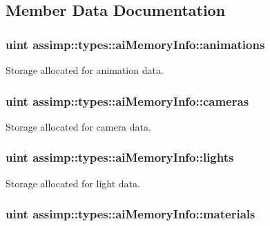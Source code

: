 \subsection{Member Data Documentation}
\hypertarget{structassimp_1_1types_1_1ai_memory_info_aee7913ca2406845fb1e38e4ae7c0c45a}{
\subsubsection[{animations}]{\setlength{\rightskip}{0pt plus 5cm}uint assimp\+::types\+::ai\+Memory\+Info\+::animations}}\label{structassimp_1_1types_1_1ai_memory_info_aee7913ca2406845fb1e38e4ae7c0c45a}
Storage allocated for animation data. \hypertarget{structassimp_1_1types_1_1ai_memory_info_a71247c6f2abba98245066bb3147c5e0f}{
\subsubsection[{cameras}]{\setlength{\rightskip}{0pt plus 5cm}uint assimp\+::types\+::ai\+Memory\+Info\+::cameras}}\label{structassimp_1_1types_1_1ai_memory_info_a71247c6f2abba98245066bb3147c5e0f}
Storage allocated for camera data. \hypertarget{structassimp_1_1types_1_1ai_memory_info_af3a707fc5e15341b8c9437a7e08ce587}{
\subsubsection[{lights}]{\setlength{\rightskip}{0pt plus 5cm}uint assimp\+::types\+::ai\+Memory\+Info\+::lights}}\label{structassimp_1_1types_1_1ai_memory_info_af3a707fc5e15341b8c9437a7e08ce587}
Storage allocated for light data. \hypertarget{structassimp_1_1types_1_1ai_memory_info_a2025dc0a0c1164bd455e8464e0ba18bd}{
\subsubsection[{materials}]{\setlength{\rightskip}{0pt plus 5cm}uint assimp\+::types\+::ai\+Memory\+Info\+::materials}}\label{structassimp_1_1types_1_1ai_memory_info_a2025dc0a0c1164bd455e8464e0ba18bd}
